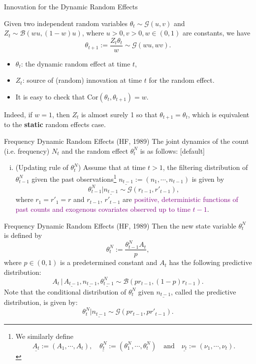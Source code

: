 \documentclass[ignorenonframetext,]{beamer}
\begin{document}
\begin{frame}{Innovation for the Dynamic Random Effects}
\begin{lemma}[Lukacs, 1955]
Given two independent random variables $\theta_t \sim \mathcal{G}(u,v)$ and $Z_t \sim \mathcal{B}(wu,(1-w)u)$,
where $u>0, v>0, w \in (0,1)$ are constants, we have
$$
\theta_{t+1} := \frac{Z_t\theta_t}{w} \sim \mathcal{G}(wu, wv).
$$
\end{lemma}
\pause
\begin{itemize}
\item $\theta_t$: the dynamic random effect at time $t$,
\pause
\item $Z_t$: source of (random) innovation at time $t$ for the random effect.
\pause
\item It is easy to check that $\text{Cor}(\theta_t, \theta_{t+1}) = w$.
\end{itemize}
\pause
Indeed, if $w=1$, then $Z_t$ is almost surely 1 so that $\theta_{t+1}=\theta_t$, which is equivalent to the \textbf{static} random effects case.
\end{frame}

\begin{frame}{Frequency Dynamic Random Effects (HF, 1989)}
The joint dynamics of the count (i.e. frequency) $N_t$ and the random effect $\theta^N_t$ is as follows:
[default]
\begin{enumerate}[i.]
\item (Updating rule of $\theta^N_t$) Assume that at time $t>1$, the filtering distribution of $\theta^N_{t-1}$
given the past observations\footnote{We similarly define
$$
\underline{A_t} := (A_1,\cdots,A_t), \quad \underline{\theta^N_t} := (\theta^N_1,\cdots,\theta^N_t) \quad \text{and} \quad \underline{\nu_t} := (\nu_1,\cdots,\nu_t).
$$}
$\underline{n_{t-1}} := (n_1,\cdots,n_{t-1})$ is given by
$$
\theta^N_{t-1}|\underline{n_{t-1}} \sim \mathcal{G}\left(r_{t-1}, r'_{t-1}\right),
$$
where $r_1 = r'_1 = r$ and $r_{t-1}$, $r'_{t-1}$ are \textcolor{purple}{positive, deterministic functions of past counts and exogenous covariates observed up to time $t-1$}.
\end{enumerate}
\end{frame}

\begin{frame}{Frequency Dynamic Random Effects (HF, 1989)}
Then the new state variable $\theta^N_t$ is defined by
$$
\theta^N_t := \frac{\theta^N_{t-1}A_t}{p},
$$
where $p \in (0,1)$ is a predetermined constant and $A_t$ has the following predictive distribution:
$$
A_t \,|\, \underline{A_{t-1}}, \underline{n_{t-1}}, \underline{\theta^N_{t-1}} \sim \mathcal{B}\left(pr_{t-1}, (1-p)r_{t-1}\right).
$$
Note that the conditional distribution of $\theta^N_t$ given $\underline{n_{t-1}}$, called the predictive distribution, is given by:
\begin{equation}\label{p3:freqpred}
\theta^N_t|\underline{n_{t-1}} \sim \mathcal{G}\left(pr_{t-1}, pr'_{t-1}\right).
\end{equation}
\end{frame}
\end{document}
